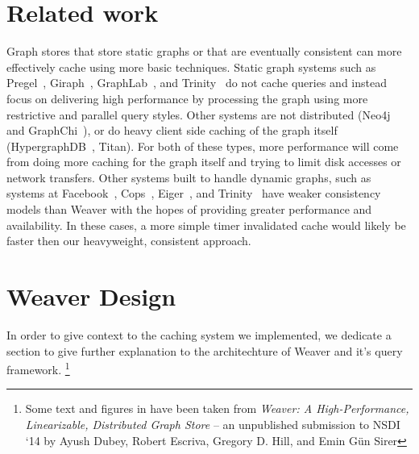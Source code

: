 \documentclass[letterpaper,twocolumn,11pt,tight]{article}
\begin{document}
\section{Related work}\label{sec:related}
Graph stores that store static graphs or that are eventually consistent can more effectively cache using more basic techniques.
Static graph systems such as Pregel~\cite{pregel}, Giraph~\cite{giraph}, GraphLab~\cite{powergraph}, and Trinity~\cite{trinity} do not cache queries and instead focus on delivering high performance by processing the graph using more restrictive and parallel query styles. %
Other systems are not distributed (Neo4j~\cite{neo4j} and GraphChi~\cite{graphchi}), or do heavy client side caching of the graph itself (HypergraphDB~\cite{hypergraphdb}, Titan\cite{titan,titan_slides}).
For both of these types, more performance will come from doing more caching for the graph itself and trying to limit disk accesses or network transfers.
Other systems built to handle dynamic graphs, such as systems at Facebook~\cite{tao,memcache_fb}, Cops~\cite{cops}, Eiger~\cite{eiger}, and Trinity~\cite{trinity} have weaker consistency models than Weaver with the hopes of providing greater performance and availability.
In these cases, a more simple timer invalidated cache would likely be faster then our heavyweight, consistent approach.

\section{Weaver Design}\label{sec:wdesign}
In order to give context to the caching system we implemented, we dedicate a section to give further explanation to the architechture of Weaver and it's query framework.
\footnote{Some text and figures in  have been taken from \emph{Weaver: A High-Performance, Linearizable, Distributed Graph Store} -- an unpublished submission to NSDI `14 by Ayush Dubey, Robert Escriva, Gregory D. Hill, and Emin G\"un Sirer}
\end{document}
